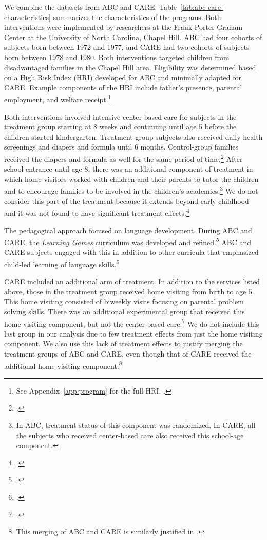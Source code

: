 We combine the datasets from ABC and CARE. Table~\ref{tab:abc-care-characteristics} summarizes the characteristics of the programs. Both interventions were implemented by researchers at the Frank Porter Graham Center at the University of North Carolina, Chapel Hill. ABC had four cohorts of subjects born between 1972 and 1977, and CARE had two cohorts of subjects born between 1978 and 1980. Both interventions targeted children from disadvantaged families in the Chapel Hill area. Eligibility was determined based on a High Risk Index (HRI) developed for ABC and minimally adapted for CARE. Example components of the HRI include father's presence, parental employment, and welfare receipt.\footnote{See Appendix~\ref{app:program} for the full HRI. \citet{Ramey_Smith_1977_AJMD, Wasik_Ramey_etal_1990_CD, Ramey_Campbell_1991_childreninpoverty}.}

Both interventions involved intensive center-based care for subjects in the treatment group starting at 8 weeks and continuing until age 5 before the children started kindergarten. Treatment-group subjects also received daily health screenings and diapers and formula until 6 months. Control-group families received the diapers and formula as well for the same period of time.\footnote{\citet{Wasik_Ramey_etal_1990_CD}.}  After school entrance until age 8, there was an additional component of treatment in which home visitors worked with children and their parents to tutor the children and to encourage families to be involved in the children's academics.\footnote{In ABC, treatment status of this component was randomized. In CARE, all the subjects who received center-based care also received this school-age component.} We do not consider this part of the treatment because it extends beyond early childhood and it was not found to have significant treatment effects.\footnote{\citet{Campbell_Ramey_etal_2002_ADS}.} 

The pedagogical approach focused on language development. During ABC and CARE, the \textit{Learning Games} curriculum was developed and refined.\footnote{\citet{Sparling_Lewis_1979_BOOKLearninggamesFirstThree}.} ABC and CARE subjects engaged with this in addition to other curricula that emphasized child-led learning of language skills.\footnote{\citet{Conti_etal_2016_LongTermHealth}.}

CARE included an additional arm of treatment. In addition to the services listed above, those in the treatment group received home visiting from birth to age 5. This home visiting consisted of biweekly visits focusing on parental problem solving skills. There was an additional experimental group that received this home visiting component, but not the center-based care.\footnote{\citet{Wasik_Ramey_etal_1990_CD}.} We do not include this last group in our analysis due to few treatment effects from just the home visiting component. We also use this lack of treatment effects to justify merging the treatment groups of ABC and CARE, even though that of CARE received the additional home-visiting component.\footnote{This merging of ABC and CARE is similarly justified in \citet{Garcia_etal_2016_Comp_CBA_Unpublished}.}

